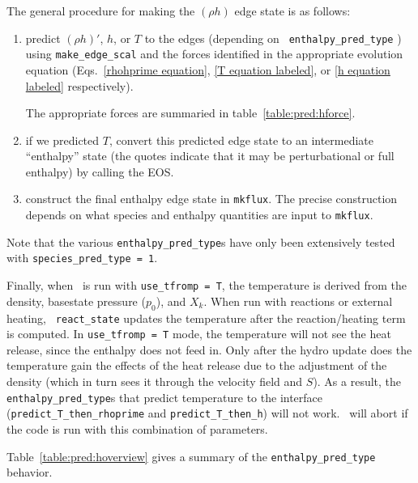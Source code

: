 The general procedure for making the $(\rho h)$ edge state is as follows:
\begin{enumerate}
\item predict $(\rho h)'$, $h$, or $T$ to the edges (depending on {\tt
  enthalpy\_pred\_type} ) using {\tt make\_edge\_scal} and the forces
  identified in the appropriate evolution equation
  (Eqs.~\ref{rhohprime equation}, \ref{T equation labeled}, or \ref{h
    equation labeled} respectively).

  The appropriate forces are summaried in table~\ref{table:pred:hforce}.

\item if we predicted $T$, convert this predicted
  edge state to an intermediate ``enthalpy'' state (the quotes
  indicate that it may be perturbational or full enthalpy) by calling
  the EOS.
 
\item construct the final enthalpy edge state in {\tt mkflux}.  The
  precise construction depends on what species and enthalpy quantities
  are input to {\tt mkflux}.

\end{enumerate}

\noindent Note that the various {\tt enthalpy\_pred\_type}s have only been
extensively tested with {\tt species\_pred\_type = 1}.  

Finally, when \maestro\ is run with {\tt use\_tfromp = T}, the
temperature is derived from the density, basestate pressure ($p_0$),
and $X_k$.  When run with reactions or external heating, {\tt
  react\_state} updates the temperature after the reaction/heating
term is computed.  In {\tt use\_tfromp = T} mode, the temperature will
not see the heat release, since the enthalpy does not feed in.  Only
after the hydro update does the temperature gain the effects of the
heat release due to the adjustment of the density (which in turn sees
it through the velocity field and $S$).  As a result, the {\tt
  enthalpy\_pred\_type}s that predict temperature to the interface
({\tt predict\_T\_then\_rhoprime} and {\tt predict\_T\_then\_h}) will
not work.  \maestro\ will abort if the code is run with this
combination of parameters.

Table~\ref{table:pred:hoverview}
gives a summary
of the {\tt enthalpy\_pred\_type} behavior.


